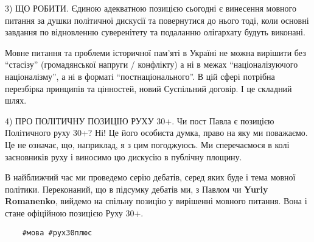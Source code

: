 3) ЩО РОБИТИ. Єдиною адекватною позицією сьогодні є винесення мовного питання
за душки політичної дискусії та повернутися до нього тоді, коли основні
завдання по відновленню суверенітету та подаланню олігархату будуть виконані. 

Мовне питання та проблеми історичної пам’яті в Україні не можна вирішити без
\enquote{стасізу} (громадянської напруги / конфлікту) а ні в межах \enquote{націоналізуючого
націоналізму}, а ні в форматі \enquote{постнаціонального}. В цій сфері потрібна
перезбірка принципів та цінностей, новий Суспільний договір. І це складний
шлях. 

4) ПРО ПОЛІТИЧНУ ПОЗИЦІЮ РУХУ 30+. Чи пост Павла є позицією Політичного руху
30+? Ні! Це його особиста думка, право на яку ми поважаємо. Це не означає, що,
наприклад, я з цим погоджуюсь. Ми сперечаємося в колі засновників руху і
виносимо цю дискусію в публічну площину. 

В найближчий час ми проведемо серію дебатів, серед яких буде і тема мовної
політики. Переконаний, що в підсумку дебатів ми, з Павлом чи \textbf{Yuriy Romanenko},
вийдемо на спільну позицію у вирішенні мовного питання. Вона і стане офіційною
позицією Руху 30+.

\begin{verbatim}
	#мова #рух30плюс
\end{verbatim}

